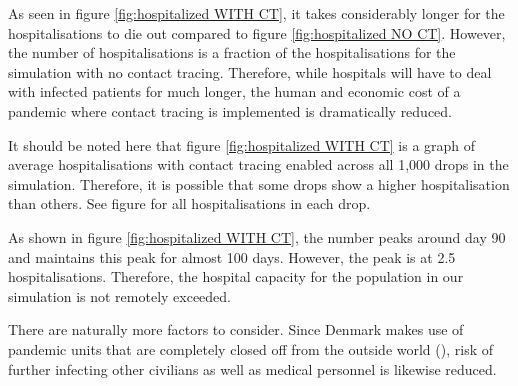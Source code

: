 As seen in figure \vref{fig:hospitalized WITH CT}, it takes considerably longer for the hospitalisations to die out compared to figure \vref{fig:hospitalized NO CT}. However, the number of hospitalisations is a fraction of the hospitalisations for the simulation with no contact tracing. Therefore, while hospitals will have to deal with infected patients for much longer, the human and economic cost of a pandemic where contact tracing is implemented is dramatically reduced.

It should be noted here that figure \ref{fig:hospitalized WITH CT} is a graph of average hospitalisations with contact tracing enabled across all 1,000 drops in the simulation. Therefore, it is possible that some drops show a higher hospitalisation than others. See figure for all hospitalisations in each drop.


As shown in figure \vref{fig:hospitalized WITH CT}, the number peaks around day 90 and maintains this peak for almost 100 days. However, the peak is at 2.5 hospitalisations. Therefore, the hospital capacity for the population in our simulation is not remotely exceeded.

There are naturally more factors to consider. Since Denmark makes use of pandemic units that are completely closed off from the outside world (\cite{dansk_sygeplejerad_fra_2020}), risk of further infecting other civilians as well as medical personnel is likewise reduced.